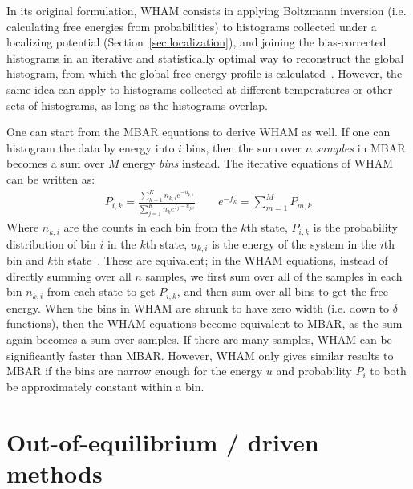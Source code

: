 \documentclass[9pt,review]{livecoms}
\begin{document}
In its original formulation, WHAM consists in applying Boltzmann inversion (i.e. calculating free energies from probabilities) to histograms collected under a localizing potential (Section~\ref{sec:localization}), and joining the bias-corrected histograms in an iterative and statistically optimal way to reconstruct the global histogram, from which the global free energy \hyperlink{ref:FES} {profile} is calculated~\cite{kumars:WHAM}.  However, the same idea can apply to histograms collected at different temperatures or other sets of histograms, as long as the histograms overlap. 

One can start from the MBAR equations to derive WHAM as well. If one can histogram the data by energy into $i$ bins, then the sum over $n$ \textit{samples} in MBAR becomes a sum over $M$ energy \textit{bins} instead. The iterative equations of WHAM can be written as:
\begin{eqnarray}
P_{i,k} = \frac{\sum_{k=1}^K n_{k,i} e^{-u_{k,i}}}{\sum_{j=1}^{K}n_k {e^{f_j-u_{j,i}}}}\qquad
e^{-f_k} = \sum_{m=1}^M P_{m,k}
\end{eqnarray}
Where $n_{k,i}$ are the counts in each bin from the $k$th state, $P_{i,k}$ is the probability distribution of bin $i$ in the $k$th state,  $u_{k,i}$ is the energy of the system in the $i$th bin and $k$th state~\cite{kumars:WHAM}. These are equivalent; in the WHAM equations, instead of directly summing over all $n$ samples, we first sum over all of the samples in each bin $n_{k,i}$ from each state to get $P_{i,k}$, and then sum over all bins to get the free energy. When the bins in WHAM are shrunk to have zero width (i.e. down to $\delta$ functions), then the WHAM equations become equivalent to MBAR, as the sum again becomes a sum over samples. If there are many samples, WHAM can be significantly faster than MBAR. However, WHAM only gives similar results to MBAR if the bins are narrow enough for the energy $u$ and probability $P_i$ to both be approximately constant within a bin.

\section{Out-of-equilibrium / driven methods}
\label{sec:Out-of-equilibrium_driven}
\end{document}
